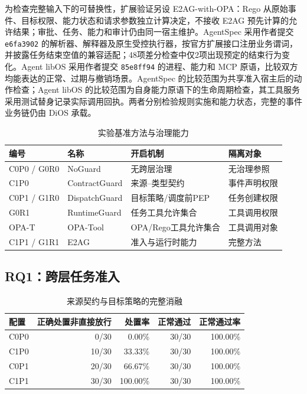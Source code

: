 为检查完整输入下的可替换性，扩展验证另设 E2AG-with-OPA：Rego 从原始事件、目标权限、能力状态和请求参数独立计算决定，不接收 E2AG 预先计算的允许结果；审批、任务、能力和审计仍由同一宿主维护。AgentSpec 采用作者提交 \texttt{e6fa3902} 的解析器、解释器及原生受控执行器，按官方扩展接口注册业务谓词，并披露任务结束空值的兼容适配；48项差分检查中仅2项出现预定的结束行为变化。Agent libOS 采用作者提交 \texttt{85e8ff94} 的进程、能力和 MCP 原语，比较双方均能表达的正常、过期与撤销场景。AgentSpec 的比较范围为共享准入宿主后的动作检查；Agent libOS 的比较范围为自身能力原语下的生命周期检查，其工具服务采用测试替身记录实际调用回执。两者分别检验规则实施和能力状态，完整的事件业务链仍由 DiOS 承载。

\begin{table}[htbp]
\centering
\caption{实验基准方法与治理能力}
\label{tab:baselines-v11}
\small
\begin{tabular}{llll}
\toprule
编号 & 名称 & 开启机制 & 隔离对象 \\
\midrule
C0P0 / G0R0 & NoGuard & 无跨层治理 & 无治理参照 \\
C1P0 & ContractGuard & 来源--类型契约 & 事件声明权限 \\
C0P1 / G1R0 & DispatchGuard & 目标策略/调度前PEP & 任务创建权限 \\
G0R1 & RuntimeGuard & 任务工具允许集合 & 工具调用权限 \\
OPA-T & OPA-Tool & OPA/Rego工具允许集合 & 工具调用对象 \\
C1P1 / G1R1 & E2AG & 准入与运行时能力 & 完整方法 \\
\bottomrule
\end{tabular}
\end{table}

\subsection{RQ1：跨层任务准入}

\begin{table}[htbp]
\centering
\caption{来源契约与目标策略的完整消融}
\label{tab:rq1-v11}
\small
\begin{tabular}{lrrrr}
\toprule
配置 & 正确处置非直接放行 & 处置率 & 正常通过 & 正常通过率 \\
\midrule
C0P0 & 0/30 & 0.00\% & 30/30 & 100.00\% \\
C1P0 & 10/30 & 33.33\% & 30/30 & 100.00\% \\
C0P1 & 20/30 & 66.67\% & 30/30 & 100.00\% \\
C1P1 & 30/30 & 100.00\% & 30/30 & 100.00\% \\
\bottomrule
\end{tabular}
\end{table}

